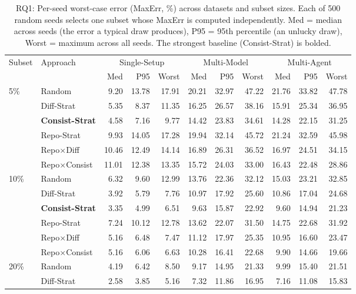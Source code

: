 \begin{table}[t]
\centering
\caption{RQ1: Per-seed worst-case error (MaxErr, \%) across datasets and subset sizes. Each of 500 random seeds selects one subset whose MaxErr is computed independently. Med = median across seeds (the error a typical draw produces), P95 = 95th percentile (an unlucky draw), Worst = maximum across all seeds. The strongest baseline (Consist-Strat) is bolded.}
\label{tab:rq1-maxerr}
\begin{tabular}{llrrrrrrrrr}
\toprule
Subset & Approach & \multicolumn{3}{c}{Single-Setup} & \multicolumn{3}{c}{Multi-Model} & \multicolumn{3}{c}{Multi-Agent} \\
\cmidrule(lr){3-5} \cmidrule(lr){6-8} \cmidrule(lr){9-11}
 &  & Med & P95 & Worst & Med & P95 & Worst & Med & P95 & Worst \\
\midrule
5\% & Random & 9.20 & 13.78 & 17.91 & 20.21 & 32.97 & 47.22 & 21.76 & 33.82 & 47.78 \\
 & Diff-Strat & 5.35 & 8.37 & 11.35 & 16.25 & 26.57 & 38.16 & 15.91 & 25.34 & 36.95 \\
 & \textbf{Consist-Strat} & 4.58 & 7.16 & 9.77 & 14.42 & 23.83 & 34.61 & 14.28 & 22.15 & 31.25 \\
 & Repo-Strat & 9.93 & 14.05 & 17.28 & 19.94 & 32.14 & 45.72 & 21.24 & 32.59 & 45.98 \\
 & Repo$\times$Diff & 10.46 & 12.49 & 14.14 & 16.89 & 26.31 & 36.52 & 16.97 & 24.51 & 34.15 \\
 & Repo$\times$Consist & 11.01 & 12.38 & 13.35 & 15.72 & 24.03 & 33.00 & 16.43 & 22.48 & 28.86 \\
\midrule
10\% & Random & 6.32 & 9.60 & 12.99 & 13.76 & 22.36 & 32.12 & 15.03 & 23.21 & 32.85 \\
 & Diff-Strat & 3.92 & 5.79 & 7.76 & 10.97 & 17.92 & 25.60 & 10.86 & 17.04 & 24.68 \\
 & \textbf{Consist-Strat} & 3.35 & 4.99 & 6.51 & 9.63 & 15.87 & 22.92 & 9.60 & 14.94 & 21.23 \\
 & Repo-Strat & 7.24 & 10.12 & 12.78 & 13.62 & 22.07 & 31.50 & 14.75 & 22.68 & 31.92 \\
 & Repo$\times$Diff & 5.16 & 6.48 & 7.47 & 11.12 & 17.97 & 25.35 & 10.95 & 16.60 & 23.47 \\
 & Repo$\times$Consist & 5.16 & 6.06 & 6.63 & 10.28 & 16.41 & 22.68 & 9.90 & 14.66 & 19.66 \\
\midrule
20\% & Random & 4.19 & 6.42 & 8.50 & 9.17 & 14.95 & 21.33 & 9.99 & 15.40 & 21.51 \\
 & Diff-Strat & 2.58 & 3.85 & 5.16 & 7.32 & 11.86 & 16.95 & 7.16 & 11.08 & 15.83 \\

\end{tabular}
\end{table}
